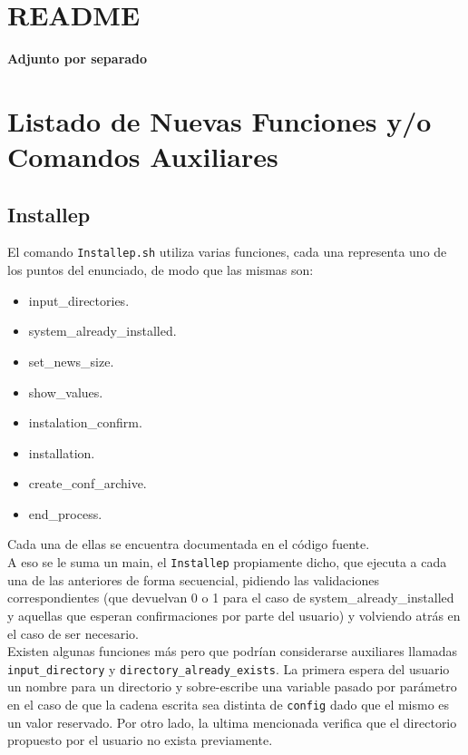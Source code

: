 \documentclass[10pt,a4paper]{article}
\begin{document}
\section{README}
\textbf{Adjunto por separado}

\section{Listado de Nuevas Funciones y/o Comandos Auxiliares}

\subsection{Installep}
El comando \texttt{Installep.sh} utiliza varias funciones, cada una representa uno de los puntos del enunciado, de modo que las mismas son:

\begin{itemize}
    \item input\_directories.
    \item system\_already\_installed.
    \item set\_news\_size.
    \item show\_values.
    \item instalation\_confirm.
    \item installation.
    \item create\_conf\_archive.
    \item end\_process.
\end{itemize}

Cada una de ellas se encuentra documentada en el código fuente.\\
A eso se le suma un main, el \texttt{Installep} propiamente dicho, que ejecuta a cada una de las anteriores de forma secuencial, pidiendo las validaciones correspondientes (que devuelvan 0 o 1 para el caso de system\_already\_installed y aquellas que esperan confirmaciones por parte del usuario) y volviendo atrás en el caso de ser necesario.\\
Existen algunas funciones más pero que podrían considerarse auxiliares llamadas \texttt{input\_directory} y \texttt{directory\_already\_exists}. La primera espera del usuario un nombre para un directorio y sobre-escribe una variable pasado por parámetro en el caso de que la cadena escrita sea distinta de \texttt{config} dado que el mismo es un valor reservado. Por otro lado, la ultima mencionada verifica que el directorio propuesto por el usuario no exista previamente.
\end{document}
